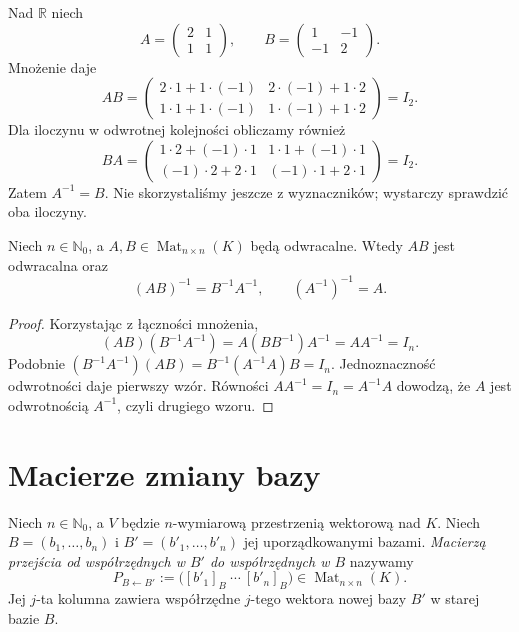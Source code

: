 \begin{przyklad}
\label{prz:lin4-odwrotnosc-2}
Nad \(\mathbb R\) niech
\[
 A=\begin{pmatrix}2&1\\1&1\end{pmatrix},
 \qquad
 B=\begin{pmatrix}1&-1\\-1&2\end{pmatrix}.
\]
Mnożenie daje
\[
 AB=
 \begin{pmatrix}
 2\cdot1+1\cdot(-1)&2\cdot(-1)+1\cdot2\\
 1\cdot1+1\cdot(-1)&1\cdot(-1)+1\cdot2
 \end{pmatrix}
 =I_2.
\]
Dla iloczynu w odwrotnej kolejności obliczamy również
\[
 BA=\begin{pmatrix}
 1\cdot2+(-1)\cdot1&1\cdot1+(-1)\cdot1\\
 (-1)\cdot2+2\cdot1&(-1)\cdot1+2\cdot1
 \end{pmatrix}=I_2.
\]
Zatem \(A^{-1}=B\).
Nie skorzystaliśmy jeszcze z wyznaczników;
wystarczy sprawdzić oba iloczyny.
\end{przyklad}

\begin{stwierdzenie}
\label{prop:lin4-iloczyn-odwrotnych}
Niech \(n\in\mathbb N_0\), a
\(A,B\in\operatorname{Mat}_{n\times n}(K)\)
będą odwracalne. Wtedy \(AB\) jest odwracalna
oraz
\[
 (AB)^{-1}=B^{-1}A^{-1},\qquad
 (A^{-1})^{-1}=A.
\]
\end{stwierdzenie}
\begin{proof}
Korzystając z łączności mnożenia,
\[
 (AB)(B^{-1}A^{-1})
 =A(BB^{-1})A^{-1}=AA^{-1}=I_n.
\]
Podobnie
\((B^{-1}A^{-1})(AB)
 =B^{-1}(A^{-1}A)B=I_n\).
Jednoznaczność odwrotności daje pierwszy wzór.
Równości \(AA^{-1}=I_n=A^{-1}A\)
dowodzą, że \(A\) jest odwrotnością \(A^{-1}\),
czyli drugiego wzoru.
\end{proof}

\section{Macierze zmiany bazy}
\label{sec:lin4-zmiana-bazy}

\begin{definicja}
\label{def:lin4-przejscie}
Niech \(n\in\mathbb N_0\), a \(V\)
będzie \(n\)-wymiarową przestrzenią
wektorową nad \(K\). Niech
\(B=(b_1,\ldots,b_n)\) i
\(B'=(b'_1,\ldots,b'_n)\) jej uporządkowanymi bazami.
\emph{Macierzą przejścia od współrzędnych w \(B'\)
do współrzędnych w \(B\)} nazywamy
\[
 P_{B\leftarrow B'}
 :=\bigl([b'_1]_B\ \cdots\ [b'_n]_B\bigr)
 \in\operatorname{Mat}_{n\times n}(K).
\]
Jej \(j\)-ta kolumna zawiera współrzędne
\(j\)-tego wektora nowej bazy \(B'\)
w starej bazie \(B\).
\end{definicja}

